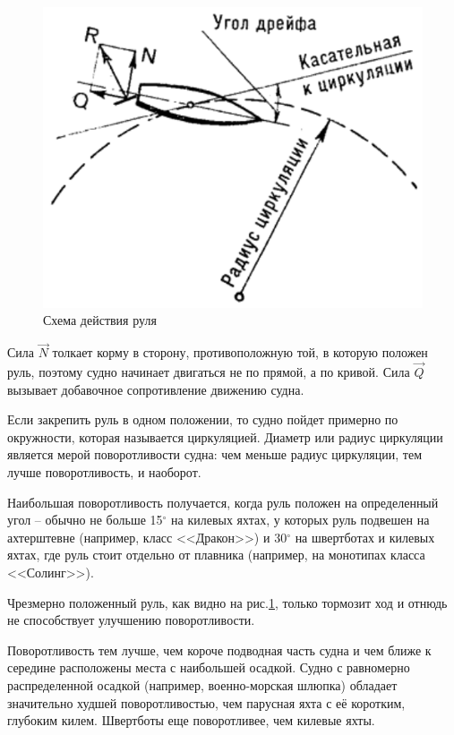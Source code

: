 \documentclass[a4paper, 12pt, twoside, final]{scrbook}
\begin{document}
\begin{figure}
   \centering
   \includegraphics[scale=0.9]{83_Shema_dejstvija_rulja} %
   \caption{Схема действия руля}
   \label{fig:83}
\end{figure}

Сила $\overrightarrow{N}$ толкает корму в сторону, противоположную той, в которую положен руль, поэтому судно начинает двигаться не по прямой, а по кривой. Сила $\overrightarrow{Q}$ вызывает добавочное сопротивление движению судна.

Если закрепить руль в одном положении, то судно пойдет примерно по окружности, которая называется циркуляцией. Диаметр или радиус циркуляции является мерой поворотливости судна: чем меньше радиус циркуляции, тем лучше поворотливость, и наоборот.

Наибольшая поворотливость получается, когда руль положен на определенный угол \--- обычно не больше 15$^\circ$ на килевых яхтах, у которых руль подвешен на ахтерштевне (например, класс <<Дракон>>) и 30$^\circ$ на швертботах и килевых яхтах, где руль стоит отдельно от плавника (например, на монотипах класса <<Солинг>>).

Чрезмерно положенный руль, как видно на рис.\ref{fig:83}, только тормозит ход и отнюдь не способствует улучшению поворотливости.

Поворотливость тем лучше, чем короче подводная часть судна и чем ближе к середине расположены места с наибольшей осадкой. Судно с равномерно распределенной осадкой (например, военно-морская шлюпка) обладает значительно худшей поворотливостью, чем парусная яхта с её коротким, глубоким килем. Швертботы еще поворотливее, чем килевые яхты.
\end{document}
